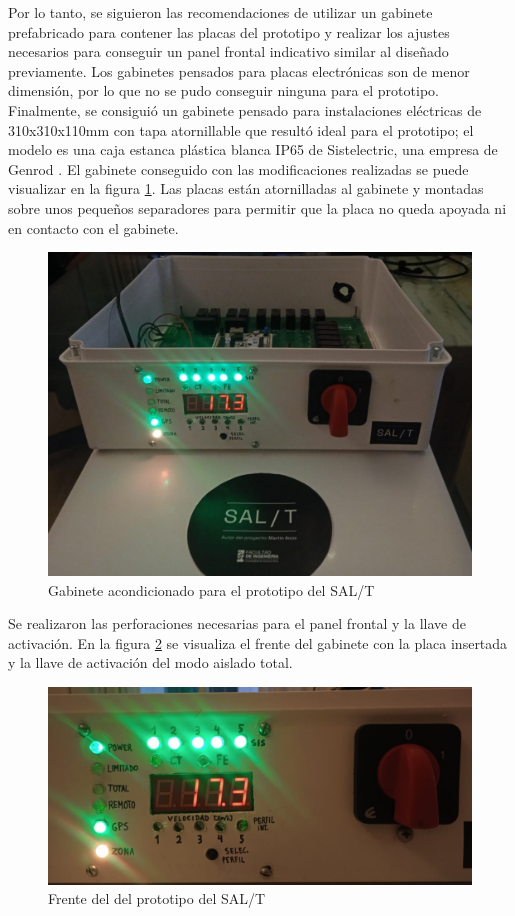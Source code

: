 Por lo tanto, se siguieron las recomendaciones de utilizar un gabinete prefabricado para contener las placas del prototipo y realizar los ajustes necesarios para conseguir un panel frontal indicativo similar al diseñado previamente. Los gabinetes pensados para placas electrónicas son de menor dimensión, por lo que no se pudo conseguir ninguna para el prototipo. Finalmente, se consiguió un gabinete pensado para instalaciones eléctricas de 310x310x110mm con tapa atornillable que resultó ideal para el prototipo; el modelo es una caja estanca plástica blanca IP65 de Sistelectric, una empresa de Genrod \cite{gabinete}. El gabinete conseguido con las modificaciones realizadas se puede visualizar en la figura \ref{fig:gabinete_fabricado}. Las placas están atornilladas al gabinete y montadas sobre unos pequeños separadores para permitir que la placa no queda apoyada ni en contacto con el gabinete. 

\begin{figure}[H]
    \centering
    \includegraphics[width = \linewidth]{img/salt_fabricado.jpeg}
    \caption{Gabinete acondicionado para el prototipo del SAL/T}
    \label{fig:gabinete_fabricado}
\end{figure} 

Se realizaron las perforaciones necesarias para el panel frontal y la llave de activación. En la figura \ref{fig:frente_fabricado} se visualiza el frente del gabinete con la placa insertada y la llave de activación del modo aislado total. 

\begin{figure}[H]
    \centering
    \includegraphics[width = \linewidth]{img/frente_fabricado.jpeg}
    \caption{Frente del del prototipo del SAL/T}
    \label{fig:frente_fabricado}
\end{figure} 